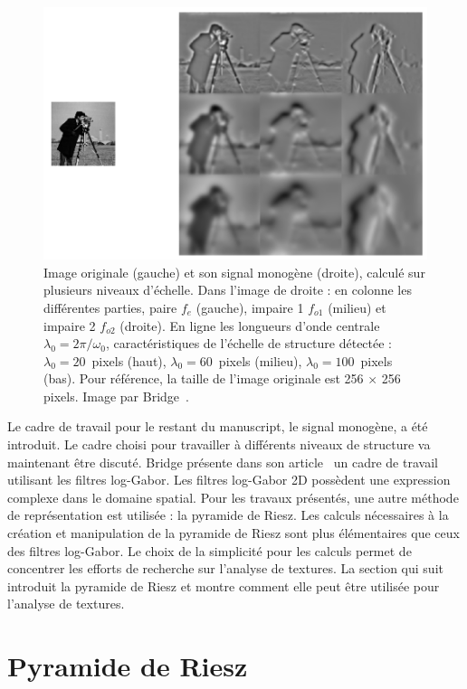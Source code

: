 \begin{figure}
    \centering
    \includegraphics[width=.75\textwidth]{resources/images/cameraman_monogenic}
    \caption[Signal monogène calculé pour plusieurs niveaux d'échelle]{Image originale (gauche) et son signal monogène (droite), calculé sur plusieurs niveaux d'échelle. Dans l'image de droite : en colonne les différentes parties, paire $f_e$ (gauche), impaire 1 $f_{o1}$ (milieu) et impaire 2 $f_{o2}$ (droite). En ligne les longueurs d'onde centrale $\lambda_0 = 2\pi/\omega_0$, caractéristiques de l'échelle de structure détectée : $\lambda_0 = 20$~pixels (haut), $\lambda_0 = 60$~pixels (milieu), $\lambda_0 = 100$~pixels (bas). Pour référence, la taille de l'image originale est 256 $\times$ 256 pixels. Image par Bridge~\cite{bridge_introduction_2018}.}
    \label{fig:cameraman-monogenic}
\end{figure}

\bigskip

Le cadre de travail pour le restant du manuscript, le signal monogène, a été introduit. Le cadre choisi pour travailler à différents niveaux de structure va maintenant être discuté. Bridge présente dans son article~\cite{bridge_introduction_2018} un cadre de travail utilisant les filtres log-Gabor. Les filtres log-Gabor 2D possèdent une expression complexe dans le domaine spatial. Pour les travaux présentés, une autre méthode de représentation est utilisée : la pyramide de Riesz. Les calculs nécessaires à la création et manipulation de la pyramide de Riesz sont plus élémentaires que ceux des filtres log-Gabor. Le choix de la simplicité pour les calculs permet de concentrer les efforts de recherche sur l'analyse de textures. La section qui suit introduit la pyramide de Riesz et montre comment elle peut être utilisée pour l'analyse de textures.

\section{Pyramide de Riesz}

